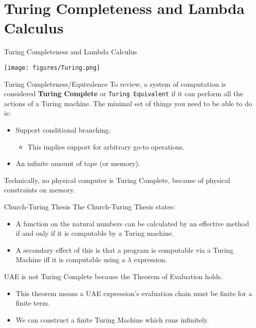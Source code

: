 \documentclass[11pt]{beamer}
\begin{document}
\section[Computability]{Turing Completeness and Lambda Calculus}
\begin{frame}[fragile=singleslide]{Turing Completeness and Lambda Calculus}
\begin{center}
\texttt{[image: figures/Turing.png]}
\end{center}
\end{frame}

\begin{frame}[fragile=singleslide]{Turing Completeness/Equivalence}
To review, a system of computation is considered \textbf{Turing Complete} or \texttt{Turing Equivalent} if it can perform all the actions of a Turing machine.  The minimal set of things you need to be able to do is:
\begin{itemize}
\item Support conditional branching.
\begin{itemize}
\item This implies support for arbitrary go-to operations.
\end{itemize}
\item An infinite amount of tape (or memory).  
\end{itemize}
Technically, no physical computer is Turing Complete, because of physical constraints on memory. 
\end{frame}


\begin{frame}[fragile=singleslide]{Church-Turing Thesis}
The Church-Turing Thesis states: 
\begin{itemize}
\item A function on the natural numbers can be calculated by an effective method if and only if it is computable by a Turing machine.
\item A secondary effect of this is that a program is computable via a Turing Machine iff it is computable using a $\lambda$ expression.
\end{itemize}
UAE is not Turing Complete because the Theorem of Evaluation holds.  
\begin{itemize}
\item This theorem means a UAE expression's evaluation chain must be finite for a finite term.  
\item We can construct a finite Turing Machine which runs infinitely.
\end{itemize}
\end{frame}
\end{document}
